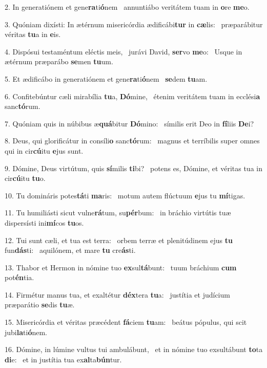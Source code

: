 2. In generatiónem et gene\textbf{ra}ti\textbf{ó}nem \ast\  annuntiábo veritátem tuam in \textbf{o}re \textbf{me}o.\

3. Quóniam dixísti: In ætérnum misericórdia ædificábi\textbf{tur} in \textbf{cæ}lis: \ast\  præparábitur véritas \textbf{tu}a in \textbf{e}is.\

4. Dispósui testaméntum eléctis meis, \dag\  jurávi David, \textbf{ser}vo \textbf{me}o: \ast\  Usque in ætérnum præparábo \textbf{se}men \textbf{tu}um.\

5. Et ædificábo in generatiónem et gene\textbf{ra}ti\textbf{ó}nem \ast\  \textbf{se}dem \textbf{tu}am.\

6. Confitebúntur cæli mirabília \textbf{tu}a, \textbf{Dó}mine, \ast\  étenim veritátem tuam in ecclési\textbf{a} sanc\textbf{tó}rum.\

7. Quóniam quis in núbibus æ\textbf{quá}bitur \textbf{Dó}mino: \ast\  símilis erit Deo in \textbf{fí}liis \textbf{De}i?\

8. Deus, qui glorificátur in consíli\textbf{o} sanc\textbf{tó}rum: \ast\  magnus et terríbilis super omnes qui in cir\textbf{cú}itu \textbf{e}jus sunt.\

9. Dómine, Deus virtútum, quis \textbf{sí}milis \textbf{ti}bi? \ast\  potens es, Dómine, et véritas tua in cir\textbf{cú}itu \textbf{tu}o.\

10. Tu domináris potes\textbf{tá}ti \textbf{ma}ris: \ast\  motum autem flúctuum \textbf{e}jus tu \textbf{mí}tigas.\

11. Tu humiliásti sicut vulne\textbf{rá}tum, su\textbf{pér}bum: \ast\  in bráchio virtútis tuæ dispersísti ini\textbf{mí}cos \textbf{tu}os.\

12. Tui sunt cæli, et tua est terra: \dag\  orbem terræ et plenitúdinem ejus \textbf{tu} fun\textbf{dás}ti: \ast\  aquilónem, et mare \textbf{tu} cre\textbf{ás}ti.\

13. Thabor et Hermon in nómine tuo \textbf{ex}sul\textbf{tá}bunt: \ast\  tuum bráchium \textbf{cum} pot\textbf{én}tia.\

14. Firmétur manus tua, et exaltétur \textbf{déx}tera \textbf{tu}a: \ast\  justítia et judícium præparátio \textbf{se}dis \textbf{tu}æ.\

15. Misericórdia et véritas præcédent \textbf{fá}ciem \textbf{tu}am: \ast\  beátus pópulus, qui scit jubi\textbf{la}ti\textbf{ó}nem.\

16. Dómine, in lúmine vultus tui ambulábunt, \dag\  et in nómine tuo exsultábunt \textbf{to}ta \textbf{di}e: \ast\  et in justítia tua ex\textbf{al}ta\textbf{bún}tur.\


